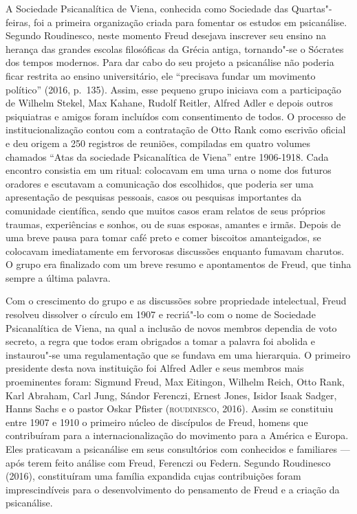 A Sociedade Psicanalítica de Viena, conhecida como Sociedade das
Quartas"-feiras, foi a primeira organização criada para fomentar os
estudos em psicanálise. Segundo Roudinesco, neste momento Freud
desejava inscrever seu ensino na herança das grandes escolas filosóficas
da Grécia antiga, tornando"-se o Sócrates dos tempos modernos. Para dar
cabo do seu projeto a psicanálise não poderia ficar restrita ao ensino
universitário, ele ``precisava fundar um movimento político'' (2016, p.~135).
Assim, esse pequeno grupo iniciava com a participação de Wilhelm Stekel,
Max Kahane, Rudolf Reitler, Alfred Adler e depois outros psiquiatras e
amigos foram incluídos com consentimento de todos. O processo de
institucionalização contou com a contratação de Otto Rank como escrivão
oficial e deu origem a 250 registros de reuniões, compiladas em quatro
volumes chamados ``Atas da sociedade Psicanalítica de Viena'' entre
1906-1918. Cada encontro consistia em um ritual: colocavam em uma urna o
nome dos futuros oradores e escutavam a comunicação dos escolhidos, que
poderia ser uma apresentação de pesquisas pessoais, casos ou pesquisas
importantes da comunidade científica, sendo que muitos casos eram
relatos de seus próprios traumas, experiências e sonhos, ou de suas
esposas, amantes e irmãs. Depois de uma breve pausa para tomar café
preto e comer biscoitos amanteigados, se colocavam imediatamente em
fervorosas discussões enquanto fumavam charutos. O grupo era finalizado
com um breve resumo e apontamentos de Freud, que tinha sempre a última
palavra.

Com o crescimento do grupo e as discussões sobre propriedade
intelectual, Freud resolveu dissolver o círculo em 1907 e recriá"-lo com
o nome de Sociedade Psicanalítica de Viena, na qual a inclusão de novos
membros dependia de voto secreto, a regra que todos eram obrigados a
tomar a palavra foi abolida e instaurou"-se uma regulamentação que se
fundava em uma hierarquia. O primeiro presidente desta nova instituição
foi Alfred Adler e seus membros mais proeminentes foram: Sigmund Freud,
Max Eitingon, Wilhelm Reich, Otto Rank, Karl Abraham, Carl Jung, Sándor
Ferenczi, Ernest Jones, Isidor Isaak Sadger, Hanns Sachs e o pastor
Oskar Pfister (\textsc{roudinesco}, 2016). Assim se constituiu entre 1907 e 1910
o primeiro núcleo de discípulos de Freud, homens que contribuíram para a
internacionalização do movimento para a América e Europa. Eles
praticavam a psicanálise em seus consultórios com conhecidos e
familiares --- após terem feito análise com Freud, Ferenczi ou Federn.
Segundo Roudinesco (2016), constituíram uma família expandida cujas
contribuições foram imprescindíveis para o desenvolvimento do pensamento
de Freud e a criação da psicanálise.

